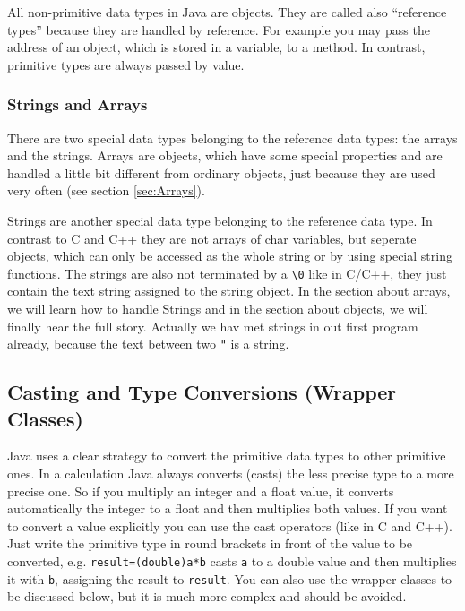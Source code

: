All non-primitive data types in Java are objects. They are
called also ``reference types'' because they are handled by
reference. For example you may pass the address of an object, which is
stored in a variable, to a method. In contrast, primitive types are
always passed by value.

\subsubsection{Strings and Arrays}
There are two special data types belonging to the reference data types:
the arrays and the strings. Arrays are objects, which have some
special properties and are handled a little bit different from
ordinary objects, just because they are used very often (see section
\ref{sec:Arrays}).

Strings are another special data type belonging to the reference data 
type. In contrast to C and C++ they are not arrays of char variables,
but seperate objects, which can only be accessed as the whole string or
by using special string functions. The strings are also not terminated
by a \verb|\0| like in C/C++, they just contain the text string
assigned to the string object. In the section about arrays, we will learn
how to handle Strings and in the section about objects, we will finally
hear the full story. Actually we hav met strings in out first program
already, because the text between two \verb|"| is a string.


\subsection{Casting and Type Conversions (Wrapper Classes)}

Java uses a clear strategy to convert the primitive data types to 
other primitive ones. In a calculation Java always converts (casts)
the less precise type to a more precise one. So if you multiply an
integer and a float value, it converts automatically the integer to
a float and then multiplies both values. If you want to convert
a value explicitly you can use the cast operators (like in C and C++).
Just write the primitive type in round brackets in front of the value to
be converted, e.g. \verb|result=(double)a*b| casts \verb|a| to 
a double value and
then multiplies it with \verb|b|, assigning the result to \verb|result|.
You can also use the wrapper classes to be discussed below, but
it is much more complex and should be avoided.

